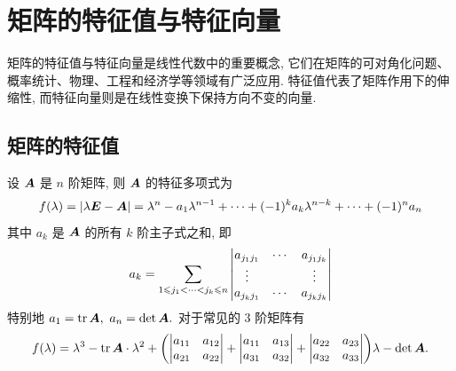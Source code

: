 \section{矩阵的特征值与特征向量}

矩阵的特征值与特征向量是线性代数中的重要概念, 它们在矩阵的可对角化问题、概率统计、物理、工程和经济学等领域有广泛应用. 特征值代表了矩阵作用下的伸缩性, 而特征向量则是在线性变换下保持方向不变的向量. 

\subsection{矩阵的特征值}

\begin{theorem}[特征多项式展开定理]
    设 $\vb*{A}$ 是 $n$ 阶矩阵, 则 $\vb*{A}$ 的特征多项式为 
    $$f(\lambda)=|\lambda\vb*{E}-\vb*{A}|=\lambda^n-a_1\lambda^{n-1}+\cdots+(-1)^ka_k\lambda^{n-k}+\cdots+(-1)^na_n$$
    其中 $a_k$ 是 $\vb*{A}$ 的所有 $k$ 阶主子式之和, 即 
    $$a_k=\sum_{1\leqslant j_1<\cdots<j_k\leqslant n}\mqty|a_{j_1j_1}&\cdots&a_{j_1j_k}\\\vdots&&\vdots\\a_{j_kj_1}&\cdots&a_{j_kj_k}|$$
    特别地 $a_1=\tr\vb*{A},~a_n=\det\vb*{A}.$
    对于常见的 3 阶矩阵有 $$f(\lambda)=\lambda^3-\tr\vb*{A}\cdot\lambda^2+\qty(\mqty|a_{11}&a_{12}\\a_{21}&a_{22}|+\mqty|a_{11}&a_{13}\\a_{31}&a_{32}|+\mqty|a_{22}&a_{23}\\a_{32}&a_{33}|)\lambda-\det\vb*{A}.$$
\end{theorem}

